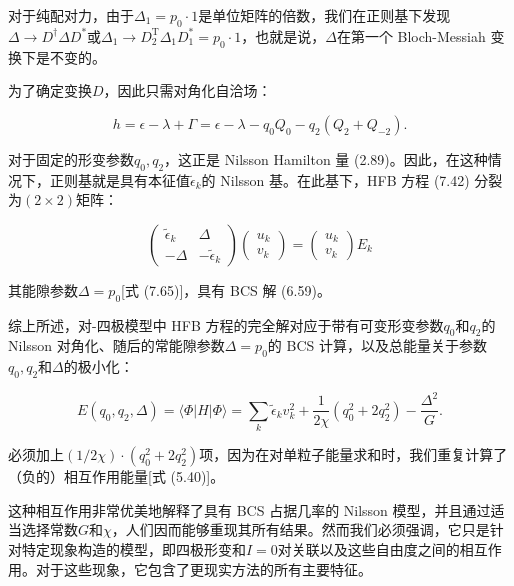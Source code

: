 对于纯配对力，由于$\Delta_{1}=p_{0}\cdot1$是单位矩阵的倍数，我们在正则基下发现$\Delta\to D^{\dagger}\Delta D^{*}$或$\Delta_{1}\to D^{\mathrm{T}}_{2}\Delta_{1}D^{*}_{1}=p_{0}\cdot1$，也就是说，$\Delta$在第一个
Bloch-Messiah 变换下是不变的。

为了确定变换$D$，因此只需对角化自洽场：

\begin{equation}
h=\epsilon-\lambda+\Gamma=\epsilon-\lambda-q_{0}Q_{0}-q_{2}(Q_{2}+Q_{-2}).\label{eq:h_field_ppq}
\end{equation}

对于固定的形变参数$q_{0},q_{2}$，这正是 Nilsson Hamilton 量 (2.89)。因此，在这种情况下，正则基就是具有本征值$\tilde{\epsilon}_{k}$的
Nilsson 基。在此基下，HFB 方程 (7.42) 分裂为$(2\times2)$矩阵：

\begin{equation}
\begin{pmatrix}\tilde{\epsilon}_{k} & \Delta\\
-\Delta & -\tilde{\epsilon}_{k}
\end{pmatrix}\begin{pmatrix}u_{k}\\
v_{k}
\end{pmatrix}=\begin{pmatrix}u_{k}\\
v_{k}
\end{pmatrix}E_{k}\label{eq:hfb_2x2_ppq}
\end{equation}

其能隙参数$\Delta=p_{0}${[}式 (7.65){]}，具有 BCS 解 (6.59)。

综上所述，对-四极模型中 HFB 方程的完全解对应于带有可变形变参数$q_{0}$和$q_{2}$的 Nilsson 对角化、随后的常能隙参数$\Delta=p_{0}$的
BCS 计算，以及总能量关于参数$q_{0},q_{2}$和$\Delta$的极小化：

\begin{equation}
E(q_{0},q_{2},\Delta)=\langle\Phi|H|\Phi\rangle=\sum_{k}\tilde{\epsilon}_{k}v^{2}_{k}+\frac{1}{2\chi}(q^{2}_{0}+2q^{2}_{2})-\frac{\Delta^{2}}{G}.\label{eq:energy_ppq_min}
\end{equation}

必须加上$(1/2\chi)\cdot(q^{2}_{0}+2q^{2}_{2})$项，因为在对单粒子能量求和时，我们重复计算了（负的）相互作用能量{[}式
(5.40){]}。

这种相互作用非常优美地解释了具有 BCS 占据几率的 Nilsson 模型，并且通过适当选择常数$G$和$\chi$，人们因而能够重现其所有结果。然而我们必须强调，它只是针对特定现象构造的模型，即四极形变和$I=0$对关联以及这些自由度之间的相互作用。对于这些现象，它包含了更现实方法的所有主要特征。

